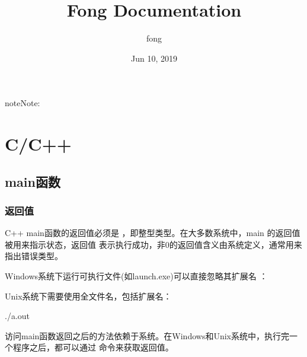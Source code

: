 \documentclass[letterpaper,10pt,english]{sphinxmanual}
\title{Fong Documentation}
\date{Jun 10, 2019}
\author{fong}
\begin{document}
\maketitle
\sphinxtableofcontents
{}\label{\detokenize{index::doc}}


\begin{sphinxadmonition}{note}{Note:}


\end{sphinxadmonition}


\chapter{C/C++}
\label{\detokenize{cpp/index:c-c}}\label{\detokenize{cpp/index::doc}}\label{\detokenize{cpp/index:id1}}

\section{main函数}
\label{\detokenize{cpp/01_main:main}}\label{\detokenize{cpp/01_main::doc}}

\subsection{返回值}
\label{\detokenize{cpp/01_main:id1}}
C++ main函数的返回值必须是  ，即整型类型。在大多数系统中，main 的返回值被用来指示状态，返回值  表示执行成功，非0的返回值含义由系统定义，通常用来指出错误类型。

Windows系统下运行可执行文件(如launch.exe)可以直接忽略其扩展名  ：

%
\begin{sphinxVerbatim}[commandchars=\\\{\}]
\end{sphinxVerbatim}

Unix系统下需要使用全文件名，包括扩展名：

%
\begin{sphinxVerbatim}[commandchars=\\\{\}]
./a.out
\end{sphinxVerbatim}

访问main函数返回之后的方法依赖于系统。在Windows和Unix系统中，执行完一个程序之后，都可以通过  命令来获取返回值。
\end{document}
